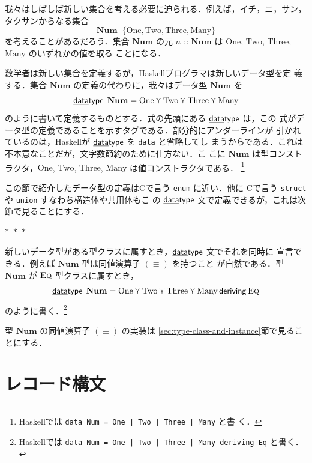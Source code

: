 \documentclass[a5paper,twoside,fleqn,draft]{jsbook}
\newcommand{\separator}{\begin{center}$*$~$*$~$*$\end{center}}
\newcommand{\programminglanguage}[1]{\textsf{#1}}
\newcommand{\clang}{\programminglanguage{C}}
\newcommand{\haskell}{\programminglanguage{Haskell}}
\newcommand{\keyword}[1]{{\underline{\textbf{#1}}}}
\newcommand{\code}[1]{\texttt{#1}}
\newcommand{\mKeyword}[1]{\mathsf{#1}} %
\newcommand{\mKeywordUnderline}[1]{\text{\underline{\textsf{#1}}}} %
\newcommand{\mDataTypeKeyword}{\mKeywordUnderline{data}\mKeyword{type}}
\newcommand{\mDerivingKeyword}{\mKeyword{deriving}}
\DeclareMathOperator{\mDataType}{\mDataTypeKeyword}
\DeclareMathOperator{\mDeriving}{\mDerivingKeyword}
\newcommand{\mSpecialConstant}[1]{\textrm{#1}} %
\newcommand{\mNumOne}{\mSpecialConstant{One}}
\newcommand{\mNumTwo}{\mSpecialConstant{Two}}
\newcommand{\mNumThree}{\mSpecialConstant{Three}}
\newcommand{\mNumMany}{\mSpecialConstant{Many}}
\DeclareMathOperator{\mDefEq}{\stackrel{\mathrm{def}}{=}}
\DeclareMathOperator{\mIn}{{:\!:}}
\DeclareMathOperator{\mValueOr}{\curlyvee}
\newcommand{\mSet}[1]{\mathbf{#1}}
\newcommand{\mType}[1]{\mathbf{#1}}
\newcommand{\mGenericTypeClass}[1]{\textsc{#1}} %
\newcommand{\mEqTypeClass}{\mGenericTypeClass{Eq}}
\begin{document}
我々はしばしば新しい集合を考える必要に迫られる．例えば，イチ，ニ，サン，
タクサンからなる集合
\begin{equation}
\mSet{Num}\mDefEq\{\mNumOne,\mNumTwo,\mNumThree,\mNumMany\}
\end{equation}
を考えることがあるだろう．集合 $\mSet{Num}$ の元 $n\mIn\mSet{Num}$ は
$\mNumOne$, $\mNumTwo$, $\mNumThree$, $\mNumMany$ のいずれかの値を取る
ことになる．

数学者は新しい集合を定義するが，\haskell プログラマは新しいデータ型を定
義する．集合 $\mSet{Num}$ の定義の代わりに，我々はデータ型
$\mType{Num}$ を
\begin{equation}
  \mDataType\;\mType{Num}
  =\mNumOne\mValueOr\mNumTwo\mValueOr\mNumThree\mValueOr\mNumMany
\end{equation}
のように書いて定義するものとする．式の先頭にある $\mDataType$ は，この
式がデータ型の定義であることを示すタグである．部分的にアンダーラインが
引かれているのは，\haskell が $\mDataType$ を \code{data} と省略してし
まうからである．これは不本意なことだが，文字数節約のために仕方ない．こ
こに $\mSet{Num}$ は型コンストラクタ，$\mNumOne$, $\mNumTwo$,
$\mNumThree$, $\mNumMany$ は値コンストラクタである．
\footnote{\haskell では \code{data Num = One | Two | Three | Many} と書
  く．}


この節で紹介したデータ型の定義は\clang で言う \code{enum} に近い．他に
\clang で言う \code{struct} や \code{union} すなわち構造体や共用体もこ
の $\mDataType$ 文で定義できるが，これは次節で見ることにする．

\separator

新しいデータ型がある型クラスに属すとき，$\mDataType$ 文でそれを同時に
宣言できる．例えば $\mType{Num}$ 型は同値演算子 $(\equiv)$ を持つこと
が自然である．型 $\mType{Num}$ が $\mEqTypeClass$ 型クラスに属すとき，
\begin{equation}
  \mDataType\;
  \mType{Num}
  =\mNumOne\mValueOr\mNumTwo\mValueOr\mNumThree\mValueOr\mNumMany
  \mDeriving\mEqTypeClass
\end{equation}
のように書く．\footnote{\haskell では \code{data Num = One | Two |
Three | Many deriving Eq} と書く．}

型 $\mType{Num}$ の同値演算子 $(\equiv)$ の実装は
\ref{sec:type-class-and-instance}節で見ることにする．

\section{レコード構文}
\end{document}
